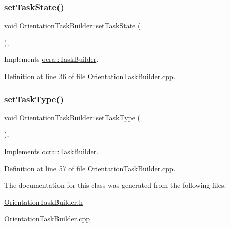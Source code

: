 \subsubsection{\texorpdfstring{set\+Task\+State()}{setTaskState()}}
{\footnotesize\ttfamily void Orientation\+Task\+Builder\+::set\+Task\+State (\begin{DoxyParamCaption}{ }\end{DoxyParamCaption})\hspace{0.3cm}{\ttfamily [protected]}, {\ttfamily [virtual]}}



Implements \hyperlink{classocra_1_1TaskBuilder_a7b44bfa101566ea4400e2d9bfdb9ff32}{ocra\+::\+Task\+Builder}.



Definition at line 36 of file Orientation\+Task\+Builder.\+cpp.

\hypertarget{classocra_1_1OrientationTaskBuilder_a491f3d3db66afb5b5e3230983b4b15c9}{}\label{classocra_1_1OrientationTaskBuilder_a491f3d3db66afb5b5e3230983b4b15c9} 
\subsubsection{\texorpdfstring{set\+Task\+Type()}{setTaskType()}}
{\footnotesize\ttfamily void Orientation\+Task\+Builder\+::set\+Task\+Type (\begin{DoxyParamCaption}{ }\end{DoxyParamCaption})\hspace{0.3cm}{\ttfamily [protected]}, {\ttfamily [virtual]}}



Implements \hyperlink{classocra_1_1TaskBuilder_a1a979fc495be6dc30483aa8fd0ff2650}{ocra\+::\+Task\+Builder}.



Definition at line 57 of file Orientation\+Task\+Builder.\+cpp.



The documentation for this class was generated from the following files\+:\begin{DoxyCompactItemize}
\item 
\hyperlink{OrientationTaskBuilder_8h}{Orientation\+Task\+Builder.\+h}\item 
\hyperlink{OrientationTaskBuilder_8cpp}{Orientation\+Task\+Builder.\+cpp}\end{DoxyCompactItemize}
